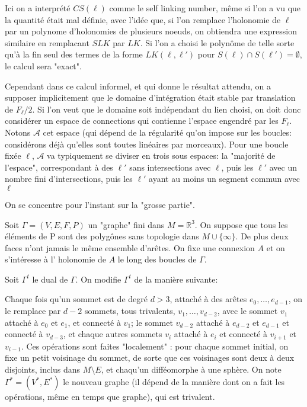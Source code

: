 \documentclass[10pt]{article}
\begin{document}
Ici on a interprété $CS(\ell)$ comme le self linking number, même si l'on a vu que la quantité était mal définie, avec l'idée que, si l'on remplace l'holonomie de $\ell$ par un polynome d'holonomies de plusieurs noeuds, on obtiendra une expression similaire en remplacant $SLK$ par $LK$. Si l'on a choisi le polynôme de telle sorte qu'à la fin seul des termes de la forme $LK(\ell, \ell')$ pour $S(\ell)\cap S(\ell')=\emptyset$, le calcul sera "exact".

Cependant dans ce calcul informel, et qui donne le résultat attendu, on a supposer implicitement que le domaine d'intégration était stable par translation de $F_\ell/2$. Si l'on veut que le domaine soit indépendant du lien choisi, on doit donc considérer un espace de connections qui contienne l'espace engendré par les $F_\ell$. Notons $\mathcal{A}$ cet espace (qui dépend de la régularité qu'on impose sur les boucles: considérons déjà qu'elles sont toutes linéaires par morceaux). Pour une boucle fixée $\ell$, $\mathcal{A}$ va typiquement se diviser en trois sous espaces: la "majorité de l'espace", correspondant à des $\ell'$ sans intersections avec $\ell$, puis les $\ell'$ avec un nombre fini d'intersections, puis les $\ell'$ ayant au moins un segment commun avec $\ell$ %

On se concentre pour l'instant sur la "grosse partie".

Soit $\Gamma=(V,E,F,P)$ un "graphe" fini dans $M=\mathbb{R}^3$. On suppose que tous les éléments de P sont des polygônes sans topologie dans $M\cup \{\infty\}$. De plus deux faces n'ont jamais le même ensemble d'arêtes.
On fixe une connexion $A$ et on s'intéresse à l' holonomie de $A$ le long des boucles de $\Gamma$.

Soit $\Gamma^t$  le dual de $\Gamma$. On modifie $\Gamma^t$ de la manière suivante:

Chaque fois qu'un sommet est de degré $d>3$, attaché à des arêtes $e_0, \dots , e_{d-1}$, on le remplace par $d-2$ sommets, tous trivalents, $v_1, \dots , v_{d-2}$, avec le sommet $v_1$ attaché à $e_0$ et $e_1$, et connecté à $v_1$; le sommet $v_{d-2}$ attaché à $e_{d-2}$ et $e_{d-1}$ et connecté à $v_{d-3}$, et chaque autres sommets $v_i$ attaché à $e_i$ et connecté à $v_{i+1}$ et $v_{i-1}$. Ces opérations sont faites "localement" : pour chaque sommet initial, on fixe un petit voisinage du sommet, de sorte que ces voisinages sont deux à deux disjoints, inclus dans
$M\setminus E$, et chaqu'un difféomorphe à une sphère. On note
$\Gamma^*=(V^*,E^*)$ le nouveau graphe (il dépend de la manière dont on a fait les opérations, même en temps que graphe), qui est trivalent.
\end{document}
